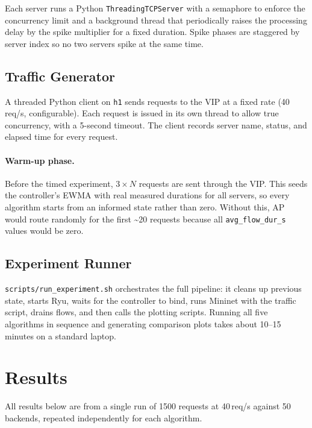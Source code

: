 \documentclass[10pt,a4paper,twocolumn]{article}
\numberwithin{figure}{section}
\numberwithin{table}{section}
\numberwithin{equation}{section}
\begin{document}
Each server runs a Python \texttt{ThreadingTCPServer} with a semaphore to enforce
the concurrency limit and a background thread that periodically raises the
processing delay by the spike multiplier for a fixed duration. Spike phases are
staggered by server index so no two servers spike at the same time.

\subsection{Traffic Generator}

A threaded Python client on \texttt{h1} sends requests to the VIP at a fixed
rate (40\,req/s, configurable). Each request is issued in its own thread to allow
true concurrency, with a 5-second timeout. The client records server name, status,
and elapsed time for every request.

\paragraph{Warm-up phase.}
Before the timed experiment, $3 \times N$ requests are sent through the VIP.
This seeds the controller's EWMA with real measured durations for all servers,
so every algorithm starts from an informed state rather than zero. Without this,
AP would route randomly for the first \textasciitilde20 requests because all
\texttt{avg\_flow\_dur\_s} values would be zero.

\subsection{Experiment Runner}

\texttt{scripts/run\_experiment.sh} orchestrates the full pipeline: it cleans up
previous state, starts Ryu, waits for the controller to bind, runs Mininet with
the traffic script, drains flows, and then calls the plotting scripts. Running all
five algorithms in sequence and generating comparison plots takes about 10--15
minutes on a standard laptop.

\section{Results}
\label{sec:results}

All results below are from a single run of 1500 requests at 40\,req/s against
50 backends, repeated independently for each algorithm.
\end{document}

